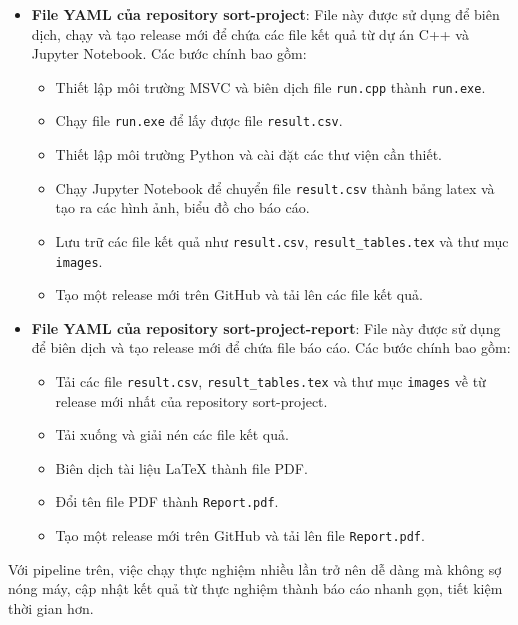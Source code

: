 \begin{itemize}
    \item \textbf{File YAML của repository sort-project}: File này được sử dụng để biên dịch, chạy và tạo release mới để chứa các file kết quả từ dự án C++ và Jupyter Notebook. Các bước chính bao gồm:
    \begin{itemize}
        \item Thiết lập môi trường MSVC và biên dịch file \texttt{run.cpp} thành \texttt{run.exe}.
        \item Chạy file \texttt{run.exe} để lấy được file \texttt{result.csv}.
        \item Thiết lập môi trường Python và cài đặt các thư viện cần thiết.
        \item Chạy Jupyter Notebook để chuyển file \texttt{result.csv} thành bảng latex và tạo ra các hình ảnh, biểu đồ cho báo cáo.
        \item Lưu trữ các file kết quả như \texttt{result.csv}, \texttt{result\_tables.tex} và thư mục \texttt{images}.
        \item Tạo một release mới trên GitHub và tải lên các file kết quả.
    \end{itemize}
    
    \item \textbf{File YAML của repository sort-project-report}: File này được sử dụng để biên dịch và tạo release mới để chứa file báo cáo. Các bước chính bao gồm:
    \begin{itemize}
        \item Tải các file \texttt{result.csv}, \texttt{result\_tables.tex} và thư mục \texttt{images} về từ release mới nhất của repository sort-project.
        \item Tải xuống và giải nén các file kết quả.
        \item Biên dịch tài liệu LaTeX thành file PDF.
        \item Đổi tên file PDF thành \texttt{Report.pdf}.
        \item Tạo một release mới trên GitHub và tải lên file \texttt{Report.pdf}.
    \end{itemize}
\end{itemize}

Với pipeline trên, việc chạy thực nghiệm nhiều lần trở nên dễ dàng mà không sợ nóng máy, cập nhật kết quả từ thực nghiệm thành báo cáo nhanh gọn, tiết kiệm thời gian hơn.